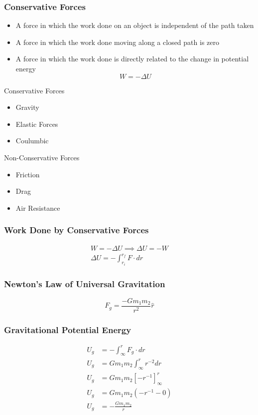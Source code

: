 \documentclass[../Notes.tex]{subfiles}
\begin{document}
\subsubsection{Conservative Forces}
\begin{itemize}
	\item A force in which the work done on an object is independent of the path taken
	\item A force in which the work done moving along a closed path is zero
	\item A force in which the work done is directly related to the change in potential energy
	\begin{equation*}
		W = - \Delta U
	\end{equation*}
\end{itemize}
Conservative Forces
\begin{itemize}
	\item Gravity
	\item Elastic Forces
	\item Coulumbic
\end{itemize}
Non-Conservative Forces
\begin{itemize}
	\item Friction
	\item Drag
	\item Air Resistance
\end{itemize}

\subsubsection{Work Done by Conservative Forces}
\begin{align*}
	W = -\Delta U \implies 
	\Delta U = -W \\
	\Delta U = - \int_{r_i}^{r_f} F \cdot dr
\end{align*}

\subsubsection{Newton's Law of Universal Gravitation}
\begin{equation*}
	F_g = \frac{-G m_1 m_2}{r^2} {\hat r}
\end{equation*}

\subsubsection{Gravitational Potential Energy}
\begin{align*}
	U_g &= - \int_{\infty}^{r} F_g \cdot dr \\
	U_g &= G m_1 m_2 \int_{\infty}^{r} r^{-2} dr \\
	U_g &= G m_1 m_2 \left[ - r^{-1} \right]_{\infty}^{r} \\
	U_g &= G m_1 m_2 \left( - r^{-1} - 0 \right) \\
	U_g &= -\frac{G m_1 m_2}{r} 
\end{align*}
\end{document}
